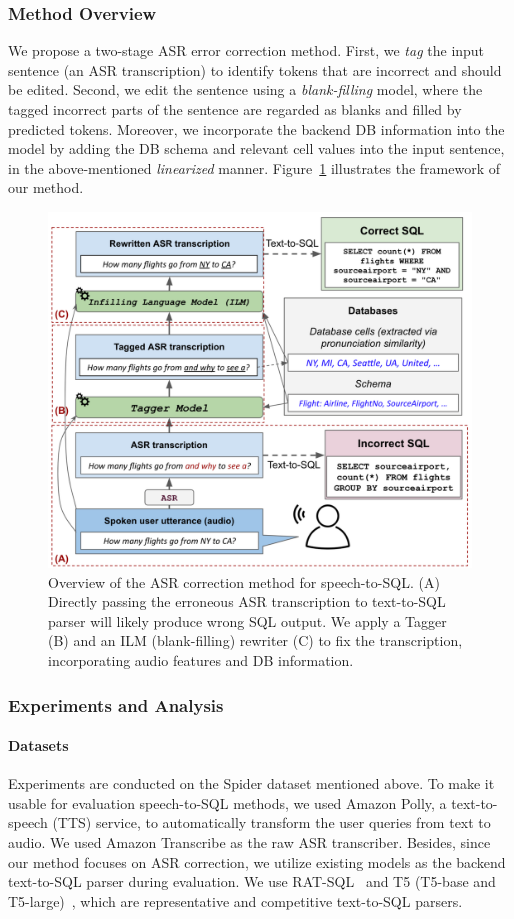 \documentclass[11pt,dvipdfm]{article}
\begin{document}
\subsubsection{Method Overview}
We propose a two-stage ASR error correction method. First, we \textit{tag} the input sentence (an ASR transcription) to identify tokens that are incorrect and should be edited. Second, we edit the sentence using a \textit{blank-filling} model, where the tagged incorrect parts of the sentence are regarded as blanks and filled by predicted tokens.
Moreover, we incorporate the backend DB information into the model by adding the DB schema and relevant cell values into the input sentence, in the above-mentioned \textit{linearized} manner. Figure~\ref{fig:speakql-figure-1} illustrates the framework of our method.

\begin{figure}[h]
\centering
\includegraphics[width=0.7\linewidth]{figs/speakql-fig1.pdf}
\caption{Overview of the ASR correction method for speech-to-SQL. (A) Directly passing the erroneous ASR transcription to text-to-SQL parser will likely produce wrong SQL output. We apply a Tagger (B) and an ILM (blank-filling) rewriter (C) to fix the transcription, incorporating audio features and DB information.}
\label{fig:speakql-figure-1}
\end{figure}


\subsubsection{Experiments and Analysis}
\paragraph{Datasets} Experiments are conducted on the Spider dataset mentioned above. To make it usable for evaluation speech-to-SQL methods, we used Amazon Polly, a text-to-speech (TTS) service, to automatically transform the user queries from text to audio. We used Amazon Transcribe as the raw ASR transcriber.
Besides, since our method focuses on ASR correction, we utilize existing models as the backend text-to-SQL parser during evaluation. We use RAT-SQL~\cite{ratsql} and T5 (T5-base and T5-large)~\cite{uskg}, which are representative and competitive text-to-SQL parsers.
\end{document}
